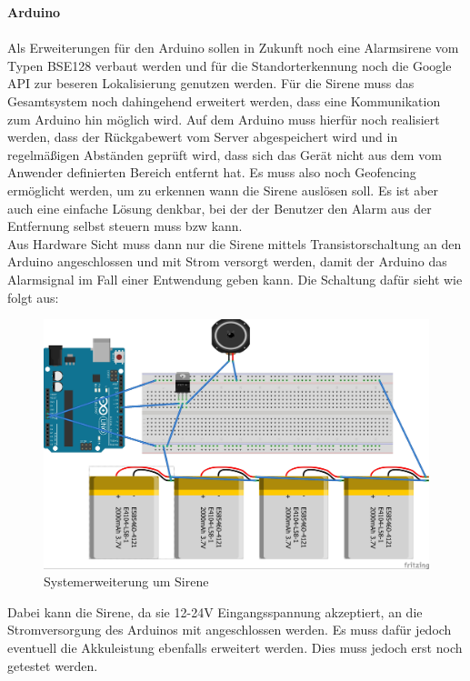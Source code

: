 \textbf{Arduino}
\\
\\
Als Erweiterungen für den Arduino sollen in Zukunft noch eine Alarmsirene vom Typen BSE128 verbaut werden und für die Standorterkennung noch die Google API zur beseren Lokalisierung genutzen werden. 
Für die Sirene muss das Gesamtsystem noch dahingehend erweitert werden, dass eine Kommunikation zum Arduino hin möglich wird. Auf dem Arduino muss hierfür noch realisiert werden, dass der Rückgabewert vom Server abgespeichert wird und in regelmäßigen Abständen geprüft wird, dass sich das Gerät nicht aus dem vom Anwender definierten Bereich entfernt hat. Es muss also noch Geofencing ermöglicht werden, um zu erkennen wann die Sirene auslösen soll. Es ist aber auch eine einfache Lösung denkbar, bei der der Benutzer den Alarm aus der Entfernung selbst steuern muss bzw kann.
\\
Aus Hardware Sicht muss dann nur die Sirene mittels Transistorschaltung an den Arduino angeschlossen und mit Strom versorgt werden, damit der Arduino das Alarmsignal im Fall einer Entwendung geben kann. Die Schaltung dafür sieht wie folgt aus:
\begin{figure} [H]
	\begin{center}
		\includegraphics[width=1\textwidth]{Bilder/Arduino_Sirene.jpg}
		\caption{Systemerweiterung um Sirene}
		\label{sirene}
	\end{center}
\end{figure}
Dabei kann die Sirene, da sie 12-24V Eingangsspannung akzeptiert, an die Stromversorgung des Arduinos mit angeschlossen werden. Es muss dafür jedoch eventuell die Akkuleistung ebenfalls erweitert werden. Dies muss jedoch erst noch getestet werden. 
\\
